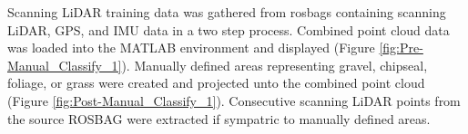 \documentclass[numbered,pdftex]{ohio-etd}
\begin{document}
{{{{%
%					
%				
%				

				{Scanning LiDAR training data was gathered  from rosbags containing scanning LiDAR, GPS, and IMU data in a two step process.  Combined point cloud data was loaded into the MATLAB environment and displayed (Figure \ref{fig:Pre-Manual_Classify_1}). Manually defined areas representing gravel, chipseal, foliage, or grass were created and projected unto the combined point cloud (Figure \ref{fig:Post-Manual_Classify_1}). Consecutive scanning LiDAR points from the source ROSBAG were extracted if sympatric to manually defined areas.}
				
}}}}
\end{document}
